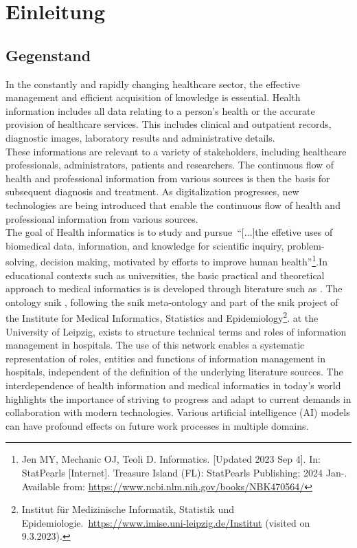 \chapter{Einleitung}\label{ch:introduction}
\section{Gegenstand}
In the constantly and rapidly changing healthcare sector, the effective management and efficient acquisition of knowledge is essential. Health information includes all data relating to a person's health or the accurate provision of healthcare services. This includes clinical and outpatient records, diagnostic images, laboratory results and administrative details.\\

These informations are relevant to a variety of stakeholders, including healthcare professionals, administrators, patients and researchers. The continuous flow of health and professional information from various sources is then the basis for subsequent diagnosis and treatment. As digitalization progresses, new technologies are being introduced that enable the continuous flow of health and professional information from various sources.\\
 
The goal of Health informatics is to study and pursue~\enquote{[$\dots$]the effetive uses of biomedical data, information, and knowledge for scientific inquiry, problem-solving, decision making, motivated by efforts to improve human health}\footnote{\raggedright{}Jen MY, Mechanic OJ, Teoli D. Informatics. [Updated 2023 Sep 4]. In: StatPearls [Internet]. Treasure Island (FL): StatPearls Publishing; 2024 Jan-. Available from: \url{https://www.ncbi.nlm.nih.gov/books/NBK470564/}}.In educational contexts such as universities, the basic practical and theoretical approach to medical informatics is is developed through literature such as \citet{bb}. The ontology \ac{snik} \citep{semantischesnetz}, following the \ac{snik} meta-ontology and part of the \ac{snik} project of the Institute for Medical Informatics, Statistics and Epidemiology\footnote{\raggedright{}Institut für Medizinische Informatik, Statistik und Epidemiologie.\ \url{https://www.imise.uni-leipzig.de/Institut} (visited on 9.3.2023).}. at the University of Leipzig, exists to structure technical terms and roles of information management in hospitals. The use of this network enables a systematic representation of roles, entities and functions of information management in hospitals, independent of the definition of the underlying literature sources. The interdependence of health information and medical informatics in today's world highlights the importance of striving to progress and adapt to current demands in collaboration with modern technologies. Various artificial intelligence (AI) models can have profound effects on future work processes in multiple domains.

